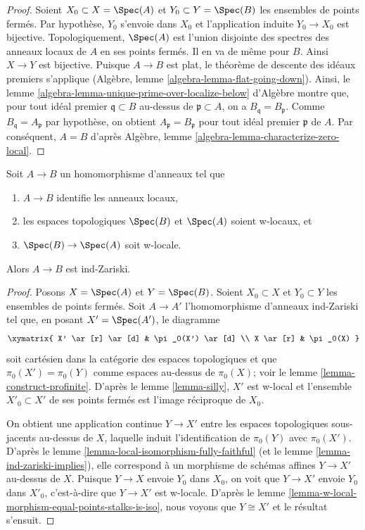 \begin{proof}
Soient $X_0 \subset X = \Spec(A)$ et $Y_0 \subset Y = \Spec(B)$ les
ensembles de points ferm\'es. Par hypoth\`ese, $Y_0$ s'envoie dans $X_0$ et
l'application induite $Y_0 \to X_0$ est bijective.
Topologiquement, $\Spec(A)$ est l'union disjointe des spectres
des anneaux locaux de $A$ en ses points ferm\'es.
Il en va de m\^eme pour $B$. Ainsi $X \to Y$ est bijective.
Puisque $A \to B$ est plat, le th\'eor\`eme de descente des id\'eaux premiers s'applique
(Alg\`ebre, lemme \ref{algebra-lemma-flat-going-down}).
Ainsi, le lemme \ref{algebra-lemma-unique-prime-over-localize-below} d'Alg\`ebre
montre que, pour tout id\'eal premier $\mathfrak q \subset B$ au-dessus de
$\mathfrak p \subset A$, on a $B_\mathfrak q = B_\mathfrak p$.
Comme $B_\mathfrak q = A_\mathfrak p$ par hypoth\`ese, on
obtient $A_\mathfrak p = B_\mathfrak p$ pour tout id\'eal premier $\mathfrak p$
de $A$. Par cons\'equent, $A = B$ d'apr\`es
Alg\`ebre, lemme \ref{algebra-lemma-characterize-zero-local}.
\end{proof}

\begin{lemma}
\label{lemma-w-local-morphism-equal-stalks-is-ind-zariski}
Soit $A \to B$ un homomorphisme d'anneaux tel que
\begin{enumerate}
\item $A \to B$ identifie les anneaux locaux,
\item les espaces topologiques $\Spec(B)$ et $\Spec(A)$ soient w-locaux, et
\item $\Spec(B) \to \Spec(A)$ soit w-locale.
\end{enumerate}
Alors $A \to B$ est ind-Zariski.
\end{lemma}

\begin{proof}
Posons $X = \Spec(A)$ et $Y = \Spec(B)$. Soient $X_0 \subset X$ et
$Y_0 \subset Y$ les ensembles de points ferm\'es. Soit $A \to A'$ l'homomorphisme d'anneaux ind-Zariski
tel que, en posant $X' = \Spec(A')$, le diagramme
$$
\xymatrix{
X' \ar[r] \ar[d] & \pi_0(X') \ar[d] \\
X \ar[r] & \pi_0(X)
}
$$
soit cart\'esien dans la cat\'egorie des espaces topologiques et que
$\pi_0(X') = \pi_0(Y)$ comme espaces au-dessus de $\pi_0(X)$; voir le
lemme \ref{lemma-construct-profinite}. D'apr\`es le
lemme \ref{lemma-silly}, $X'$ est w-local et
l'ensemble $X'_0 \subset X'$ de ses points ferm\'es est l'image r\'eciproque de $X_0$.

\medskip\noindent
On obtient une application continue $Y \to X'$ entre les espaces topologiques sous-jacents
au-dessus de $X$, laquelle induit l'identification de $\pi_0(Y)$ avec $\pi_0(X')$. D'apr\`es le
lemme \ref{lemma-local-isomorphism-fully-faithful}
(et le lemme \ref{lemma-ind-zariski-implies}),
elle correspond \`a un morphisme de sch\'emas affines $Y \to X'$
au-dessus de $X$. Puisque $Y \to X$ envoie $Y_0$ dans $X_0$, on voit que
$Y \to X'$ envoie $Y_0$ dans $X'_0$, c'est-à-dire que $Y \to X'$ est w-locale.
D'après le lemme \ref{lemma-w-local-morphism-equal-points-stalks-is-iso},
nous voyons que $Y \cong X'$ et le résultat s'ensuit.
\end{proof}

